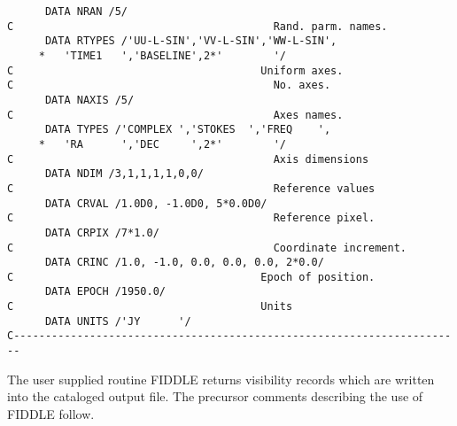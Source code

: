 \begin{verbatim}
      DATA NRAN /5/
C                                         Rand. parm. names.
      DATA RTYPES /'UU-L-SIN','VV-L-SIN','WW-L-SIN',
     *   'TIME1   ','BASELINE',2*'        '/
C                                       Uniform axes.
C                                         No. axes.
      DATA NAXIS /5/
C                                         Axes names.
      DATA TYPES /'COMPLEX ','STOKES  ','FREQ    ',
     *   'RA      ','DEC     ',2*'        '/
C                                         Axis dimensions
      DATA NDIM /3,1,1,1,1,0,0/
C                                         Reference values
      DATA CRVAL /1.0D0, -1.0D0, 5*0.0D0/
C                                         Reference pixel.
      DATA CRPIX /7*1.0/
C                                         Coordinate increment.
      DATA CRINC /1.0, -1.0, 0.0, 0.0, 0.0, 2*0.0/
C                                       Epoch of position.
      DATA EPOCH /1950.0/
C                                       Units
      DATA UNITS /'JY      '/
C-----------------------------------------------------------------------

\end{verbatim}

 The user supplied routine FIDDLE returns visibility records which are
written into the cataloged output file. The precursor comments
describing the use of FIDDLE follow.


